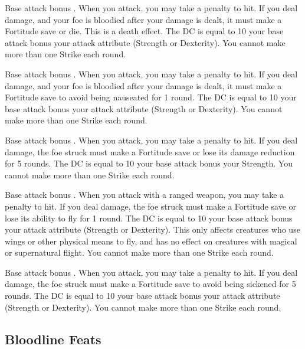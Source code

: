 \featpre Base attack bonus .
\featben When you attack, you may take a  penalty to hit. If you deal damage, and your foe is bloodied after your damage is dealt, it must make a Fortitude save or die. This is a death effect. The DC is equal to 10 \add your base attack bonus \add your attack attribute (Strength or Dexterity). You cannot make more than one Strike each round.

\featpre Base attack bonus .
\featben When you attack, you may take a  penalty to hit. If you deal damage, and your foe is bloodied after your damage is dealt, it must make a Fortitude save to avoid being nauseated for 1 round. The DC is equal to 10 \add your base attack bonus \add your attack attribute (Strength or Dexterity). You cannot make more than one Strike each round.

\featpre Base attack bonus .
\featben When you attack, you may take a  penalty to hit. If you deal damage, the foe struck must make a Fortitude save or lose its damage reduction for 5 rounds. The DC is equal to 10 \add your base attack bonus \add your Strength. You cannot make more than one Strike each round.

\featpre Base attack bonus .
\featben When you attack with a ranged weapon, you may take a  penalty to hit. If you deal damage, the foe struck must make a Fortitude save or lose its ability to fly for 1 round. The DC is equal to 10 \add your base attack bonus \add your attack attribute (Strength or Dexterity). This only affects creatures who use wings or other physical means to fly, and has no effect on creatures with magical or supernatural flight. You cannot make more than one Strike each round.

\featpre Base attack bonus .
\featben When you attack, you may take a  penalty to hit. If you deal damage, the foe struck must make a Fortitude save to avoid being sickened for 5 rounds. The DC is equal to 10 \add your base attack bonus \add your attack attribute (Strength or Dexterity). You cannot make more than one Strike each round.

\subsection{Bloodline Feats}


